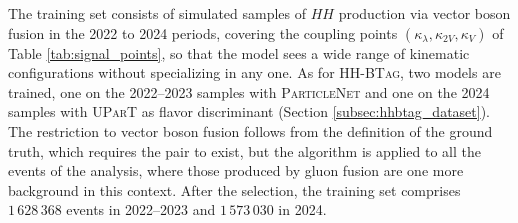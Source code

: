 

The training set consists of simulated samples of $HH$ production via vector boson fusion in the 2022 to 2024 periods, covering the coupling points $(\kappa_\lambda, \kappa_{2V}, \kappa_V)$ of Table \ref{tab:signal_points}, so that the model sees a wide range of kinematic configurations without specializing in any one. As for \textsc{HH-BTag}, two models are trained, one on the 2022--2023 samples with \textsc{ParticleNet} and one on the 2024 samples with \textsc{UParT} as flavor discriminant (Section \ref{subsec:hhbtag_dataset}). The restriction to vector boson fusion follows from the definition of the ground truth, which requires the pair to exist, but the algorithm is applied to all the events of the analysis, where those produced by gluon fusion are one more background in this context. After the selection, the training set comprises $1\,628\,368$ events in 2022--2023 and $1\,573\,030$ in 2024.


